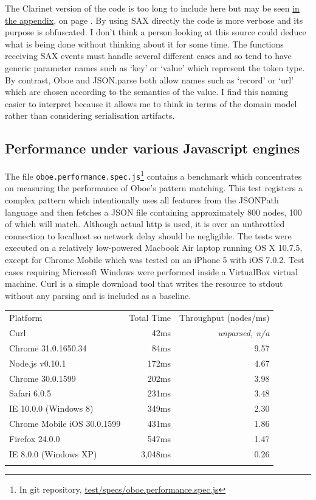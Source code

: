 \documentclass[12pt, ]{article}
\begin{document}
The Clarinet version of the code is too long to include here but may be
seen \hyperref[headerux5fbenchmarkClient]{in the appendix}, on page
\pageref{src_benchmarkClient}. By using SAX directly the code is more
verbose and its purpose is obfuscated. I don't think a person looking at
this source could deduce what is being done without thinking about it
for some time. The functions receiving SAX events must handle several
different cases and so tend to have generic parameter names such as
`key' or `value' which represent the token type. By contrast, Oboe and
JSON.parse both allow names such as `record' or `url' which are chosen
according to the semantics of the value. I find this naming easier to
interpret because it allows me to think in terms of the domain model
rather than considering serialisation artifacts.

\subsection{Performance under various Javascript
engines}\label{performance-under-various-javascript-engines}

The file \texttt{oboe.performance.spec.js}\footnote{In git repository,
  \href{https://github.com/jimhigson/oboe.js/blob/master/test/specs/oboe.performance.spec.js}{test/specs/oboe.performance.spec.js}}
contains a benchmark which concentrates on measuring the performance of
Oboe's pattern matching. This test registers a complex pattern which
intentionally uses all features from the JSONPath language and then
fetches a JSON file containing approximately 800 nodes, 100 of which
will match. Although actual http is used, it is over an unthrottled
connection to localhost so network delay should be negligible. The tests
were executed on a relatively low-powered Macbook Air laptop running OS
X 10.7.5, except for Chrome Mobile which was tested on an iPhone 5 with
iOS 7.0.2. Test cases requiring Microsoft Windows were performed inside
a VirtualBox virtual machine. Curl is a simple download tool that writes
the resource to stdout without any parsing and is included as a
baseline.

\begin{longtable}[c]{@{}lrr@{}}
\hline\noalign{\medskip}
Platform & Total Time & Throughput (nodes/ms)
\\\noalign{\medskip}
\hline\noalign{\medskip}
Curl & 42ms & \emph{unparsed, n/a}
\\\noalign{\medskip}
Chrome 31.0.1650.34 & 84ms & 9.57
\\\noalign{\medskip}
Node.js v0.10.1 & 172ms & 4.67
\\\noalign{\medskip}
Chrome 30.0.1599 & 202ms & 3.98
\\\noalign{\medskip}
Safari 6.0.5 & 231ms & 3.48
\\\noalign{\medskip}
IE 10.0.0 (Windows 8) & 349ms & 2.30
\\\noalign{\medskip}
Chrome Mobile iOS 30.0.1599 & 431ms & 1.86
\\\noalign{\medskip}
Firefox 24.0.0 & 547ms & 1.47
\\\noalign{\medskip}
IE 8.0.0 (Windows XP) & 3,048ms & 0.26
\\\noalign{\medskip}
\hline
\end{longtable}
\end{document}
